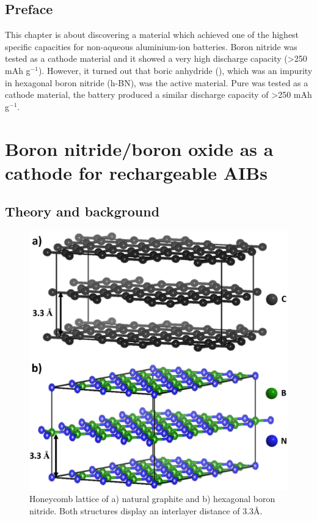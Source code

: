 \section*{Preface}
This chapter is about discovering a material which achieved one of the highest specific capacities for non-aqueous aluminium-ion batteries. Boron nitride was tested as a cathode material and it showed a very high discharge capacity (>250 mAh g$^{-1}$). However, it turned out that boric anhydride (), which was an impurity in hexagonal boron nitride (h-BN), was the active material. Pure  was tested as a cathode material, the battery produced a similar discharge capacity of >250 mAh g$^{-1}$.   

\newpage
\chapter{Boron nitride/boron oxide as a cathode for rechargeable AIBs} 
\label{BOhBN} 

\section{Theory and background}

\begin{figure}[tbh!]
\centering
\includegraphics[width=\textwidth]{Figures/BOhBN/grpBNcomp}
\caption{Honeycomb lattice of a) natural graphite and b) hexagonal boron nitride. Both structures display an interlayer distance of 3.3\AA.}
\label{Figures/BOhBN:grpBNcomp}
\end{figure}

